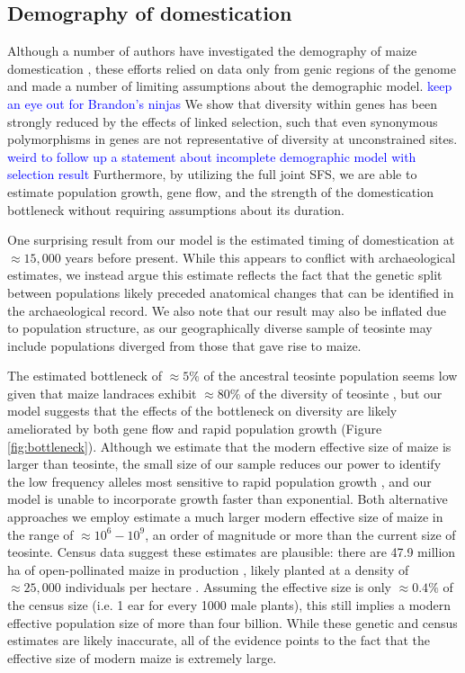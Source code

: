 \documentclass{pnastwo}
\newcommand{\mbh}[1]{\textcolor{blue}{\scriptsize #1}}
\begin{document}
\begin{article}
\subsection{Demography of domestication} %
Although a number of authors have investigated the demography of maize domestication \cite{eyre1998, tenaillon2004selection, wright2005}, these  efforts relied on data only from genic regions of the genome and made a number of limiting assumptions about the demographic model.  \mbh{keep an eye out for Brandon's ninjas}
We show that diversity within genes has been strongly reduced by the effects of linked selection, such that even synonymous polymorphisms in genes are not representative of diversity at unconstrained sites.  \mbh{weird to follow up a statement about incomplete demographic model with selection result}
Furthermore, by utilizing the full joint SFS, we are able to estimate population growth, gene flow, and the strength of the domestication bottleneck without requiring assumptions about its duration.  

One surprising result from our model is the estimated timing of domestication at $\approx 15,000$ years before present.
While this appears to conflict with archaeological \cite{piperno2009starch} estimates, we instead argue this estimate reflects the fact that the genetic split between populations likely preceded anatomical changes that can be identified in the archaeological record. 
We also note that our result may also be inflated due to population structure, as our geographically diverse sample of teosinte may include populations diverged from those that gave rise to maize.

The estimated bottleneck of $\approx 5\%$ of the ancestral teosinte population seems low given that maize landraces exhibit $\approx 80\%$ of the diversity of teosinte \cite{hufford2012}, but our model suggests that the effects of the bottleneck on diversity are likely ameliorated by both gene flow and rapid population growth (Figure \ref{fig:bottleneck}).   
Although we estimate that the modern effective size of maize is larger than teosinte, the small size of our sample reduces our power to identify the low frequency alleles most sensitive to rapid population growth \cite{keinan2012}, and our model is unable to incorporate growth faster than exponential.  
Both alternative approaches we employ estimate a much larger modern effective size of maize in the range of $\approx 10^6 - 10^9$, an order of magnitude or more than the current size of teosinte.
Census data suggest these estimates are plausible: there are 47.9 million ha of open-pollinated maize in production \cite{cimmyt1999}, likely planted at a density of $\approx 25,000$ individuals per hectare \cite{baden2001culture}.
Assuming the effective size is only $\approx 0.4\%$ of the census size (i.e. 1 ear for every 1000 male plants), this still implies a modern effective population size of more than four billion.
While these genetic and census estimates are likely inaccurate, all of the evidence points to the fact that the effective size of modern maize is extremely large.


\end{article}
\end{document}
